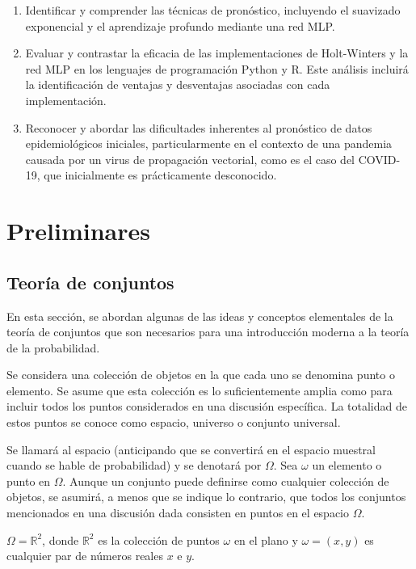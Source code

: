 \documentclass[
  us-letterpaper,
]{scrreprt}
\theoremstyle{plain}
\theoremstyle{definition}
\theoremstyle{definition}
\theoremstyle{plain}
\theoremstyle{remark}
\begin{document}
\begin{enumerate}
\def\labelenumi{\arabic{enumi}.}
\item
  Identificar y comprender las técnicas de pronóstico, incluyendo el
  suavizado exponencial y el aprendizaje profundo mediante una red MLP.
\item
  Evaluar y contrastar la eficacia de las implementaciones de
  Holt-Winters y la red MLP en los lenguajes de programación Python y R.
  Este análisis incluirá la identificación de ventajas y desventajas
  asociadas con cada implementación.
\item
  Reconocer y abordar las dificultades inherentes al pronóstico de datos
  epidemiológicos iniciales, particularmente en el contexto de una
  pandemia causada por un virus de propagación vectorial, como es el
  caso del COVID-19, que inicialmente es prácticamente desconocido.
\end{enumerate}

\part{Preliminares}

\chapter{Teoría de conjuntos}\label{teoruxeda-de-conjuntos}

En esta sección, se abordan algunas de las ideas y conceptos elementales
de la teoría de conjuntos que son necesarios para una introducción
moderna a la teoría de la probabilidad.

Se considera una colección de objetos en la que cada uno se denomina
punto o elemento. Se asume que esta colección es lo suficientemente
amplia como para incluir todos los puntos considerados en una discusión
específica. La totalidad de estos puntos se conoce como espacio,
universo o conjunto universal.

Se llamará al espacio (anticipando que se convertirá en el espacio
muestral cuando se hable de probabilidad) y se denotará por \(\Omega\).
Sea \(\omega\) un elemento o punto en \(\Omega\). Aunque un conjunto
puede definirse como cualquier colección de objetos, se asumirá, a menos
que se indique lo contrario, que todos los conjuntos mencionados en una
discusión dada consisten en puntos en el espacio \(\Omega\).

\begin{tcolorbox}[enhanced jigsaw, breakable, colbacktitle=quarto-callout-caution-color!10!white, rightrule=.15mm, toptitle=1mm, colback=white, left=2mm, colframe=quarto-callout-caution-color-frame, bottomtitle=1mm, opacitybacktitle=0.6, leftrule=.75mm, arc=.35mm, title={Ejemplo}, coltitle=black, titlerule=0mm, opacityback=0, bottomrule=.15mm, toprule=.15mm]

\(\Omega = \mathbb{R}^2\), donde \(\mathbb{R}^2\) es la colección de
puntos \(\omega\) en el plano y \(\omega=(x,y)\) es cualquier par de
números reales \(x\) e \(y\).

\end{tcolorbox}
\end{document}
